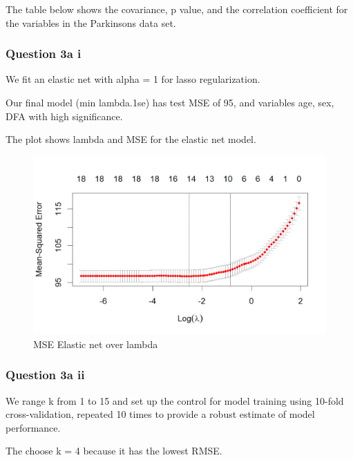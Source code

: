 \documentclass[
]{article}
\begin{document}
The table below shows the covariance, p value, and the correlation
coefficient for the variables in the Parkinsons data set.

\hypertarget{question-3a-i}{%
\subsubsection{Question 3a i}\label{question-3a-i}}

We fit an elastic net with alpha = 1 for lasso regularization.

Our final model (min lambda.1se) has test MSE of 95, and variables age,
sex, DFA with high significance.

The plot shows lambda and MSE for the elastic net model.

\begin{figure}
\centering
\includegraphics[width=4.85417in,height=\textheight]{mse_elastic_net.png}
\caption{MSE Elastic net over lambda}
\end{figure}

\hypertarget{question-3a-ii}{%
\subsubsection{Question 3a ii}\label{question-3a-ii}}

We range k from 1 to 15 and set up the control for model training using
10-fold cross-validation, repeated 10 times to provide a robust estimate
of model performance.

The choose k = 4 because it has the lowest RMSE.
\end{document}
